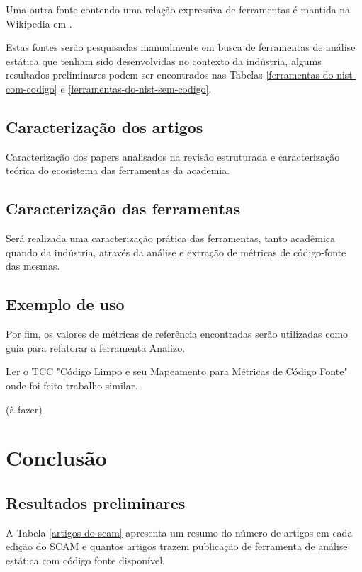 \documentclass[qual, classic, a4paper]{ufbathesis}
\begin{document}
Uma outra fonte contendo uma relação expressiva de ferramentas é mantida na
Wikipedia em .

Estas fontes serão pesquisadas manualmente em busca de ferramentas de análise
estática que tenham sido desenvolvidas no contexto da indústria, algums
resultados preliminares podem ser encontrados nas Tabelas
\ref{ferramentas-do-nist-com-codigo} e \ref{ferramentas-do-nist-sem-codigo}.

\section{Caracterização dos artigos}

Caracterização dos papers analisados na revisão estruturada e caracterização
teórica do ecosistema das ferramentas da academia.

\section{Caracterização das ferramentas}

Será realizada uma caracterização prática das ferramentas, tanto acadêmica
quando da indústria, através da análise e extração de métricas de código-fonte
das mesmas.


\section{Exemplo de uso}

Por fim, os valores de métricas de referência encontradas serão utilizadas
como guia para refatorar a ferramenta Analizo.

Ler o TCC "Código Limpo e seu Mapeamento para Métricas de Código Fonte" onde
foi feito trabalho similar.

(à fazer)

\chapter{Conclusão}

\section{Resultados preliminares}\label{resultados}

A Tabela \ref{artigos-do-scam} apresenta um resumo do número de artigos em
cada edição do SCAM e quantos artigos trazem publicação de ferramenta de análise
estática com código fonte disponível.
\end{document}
